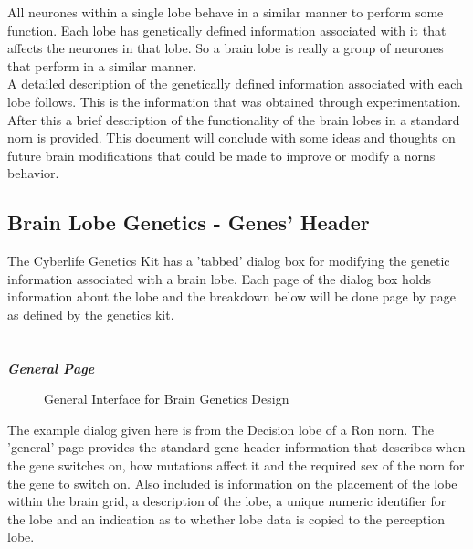 \documentclass[11pt,twoside,a4paper]{article}
\begin{document}
All neurones within a single lobe behave in a similar manner to perform some function. Each lobe has genetically defined information associated with it that affects the neurones in that lobe. So a brain lobe is really a group of neurones that perform in a similar manner.~\\

A detailed description of the genetically defined information associated with each lobe follows. This is the information that was obtained through experimentation. After this a brief description of the functionality of the brain lobes in a standard norn is provided. This document will conclude with some ideas and thoughts on future brain modifications that could be made to improve or modify a norns behavior.

\subsection{Brain Lobe Genetics - Genes' Header}

The Cyberlife Genetics Kit has a 'tabbed' dialog box for modifying the genetic information associated with a brain lobe. Each page of the dialog box holds information about the lobe and the breakdown below will be done page by page as defined by the genetics kit.~\\~\\~\\

\textbf{\textit{General Page}}~\\

\begin{minipage}{0.4\linewidth}
\begin{figure}[H]
	\centerline {} %
	\caption{General Interface for Brain Genetics Design}
	\label{fig:brain_general}
\end{figure}
\end{minipage}
\begin{minipage}{0.1\linewidth}\end{minipage}
\begin{minipage}{0.5\linewidth}
The example dialog given here is from the Decision lobe of a Ron norn. The 'general' page provides the standard gene header information that describes when the gene switches on, how mutations affect it and the required sex of the norn for the gene to switch on. Also included is information on the placement of the lobe within the brain grid, a description of the lobe, a unique numeric identifier for the lobe and an indication as to whether lobe data is copied to the perception lobe.
\end{minipage}~\\
\end{document}
